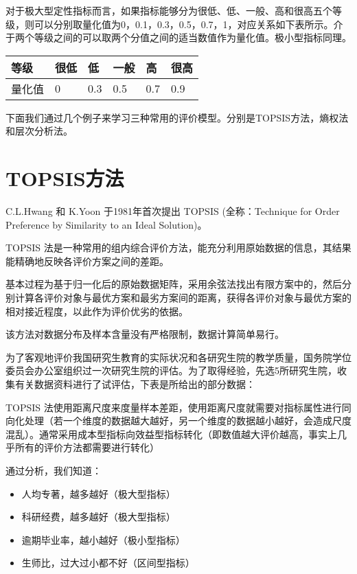 \documentclass[letterpaper,10pt,english]{sphinxmanual}
\begin{document}
对于极大型定性指标而言，如果指标能够分为很低、低、一般、高和很高五个等级，则可以分别取量化值为0，0.1，0.3，0.5，0.7，1，对应关系如下表所示。介于两个等级之间的可以取两个分值之间的适当数值作为量化值。极小型指标同理。


\begin{savenotes}\sphinxattablestart
\centering
\begin{tabulary}{\linewidth}[t]{|T|T|T|T|T|T|}
\hline
\sphinxstyletheadfamily 
等级
&\sphinxstyletheadfamily 
很低
&\sphinxstyletheadfamily 
低
&\sphinxstyletheadfamily 
一般
&\sphinxstyletheadfamily 
高
&\sphinxstyletheadfamily 
很高
\\
\hline
量化值
&
0
&
0.3
&
0.5
&
0.7
&
0.9
\\
\hline
\end{tabulary}
\par
\sphinxattableend\end{savenotes}

下面我们通过几个例子来学习三种常用的评价模型。分别是TOPSIS方法，熵权法和层次分析法。


\section{TOPSIS方法}
\label{\detokenize{docs/evaluation_model:topsis}}
C.L.Hwang 和 K.Yoon 于1981年首次提出 TOPSIS (全称：Technique for Order Preference by Similarity to an Ideal Solution)。

TOPSIS 法是一种常用的组内综合评价方法，能充分利用原始数据的信息，其结果能精确地反映各评价方案之间的差距。

基本过程为基于归一化后的原始数据矩阵，采用余弦法找出有限方案中的，然后分别计算各评价对象与最优方案和最劣方案间的距离，获得各评价对象与最优方案的相对接近程度，以此作为评价优劣的依据。

该方法对数据分布及样本含量没有严格限制，数据计算简单易行。

为了客观地评价我国研究生教育的实际状况和各研究生院的教学质量，国务院学位委员会办公室组织过一次研究生院的评估。为了取得经验，先选5所研究生院，收集有关数据资料进行了试评估，下表是所给出的部分数据：


TOPSIS 法使用距离尺度来度量样本差距，使用距离尺度就需要对指标属性进行同向化处理（若一个维度的数据越大越好，另一个维度的数据越小越好，会造成尺度混乱）。通常采用成本型指标向效益型指标转化（即数值越大评价越高，事实上几乎所有的评价方法都需要进行转化）

通过分析，我们知道：
\begin{itemize}
\item {} 
人均专著，越多越好（极大型指标）

\item {} 
科研经费，越多越好（极大型指标）

\item {} 
逾期毕业率，越小越好（极小型指标）

\item {} 
生师比，过大过小都不好（区间型指标）

\end{itemize}
\end{document}
